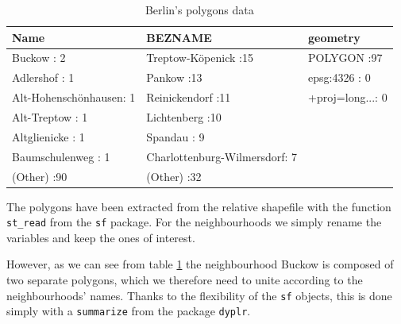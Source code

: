 \begin{table}[H]
\centering
\begin{tabular}{lll}
  \hline \hline
                  Name &                       BEZNAME &          geometry \\ 
  \hline
Buckow              : 2   & Treptow-Köpenick          :15   & POLYGON      :97   \\ 
  Adlershof           : 1   & Pankow                    :13   & epsg:4326    : 0   \\ 
  Alt-Hohenschönhausen: 1   & Reinickendorf             :11   & +proj=long...: 0   \\ 
  Alt-Treptow         : 1   & Lichtenberg               :10   &  \\ 
  Altglienicke        : 1   & Spandau                   : 9   &  \\ 
  Baumschulenweg      : 1   & Charlottenburg-Wilmersdorf: 7   &  \\ 
  (Other)             :90   & (Other)                   :32   &  \\ 
   \hline \hline
\end{tabular}
\caption{Berlin's polygons data}
\label{table:neighbourhoods}
\end{table}

The polygons have been extracted from the relative shapefile with the function \texttt{st\_read} from the \texttt{sf} package. For the neighbourhoods we simply rename the variables and keep the ones of interest.



However, as we can see from table \ref{table:neighbourhoods} the neighbourhood Buckow is composed of two separate polygons, which we therefore need to unite according to the neighbourhoods' names. Thanks to the flexibility of the \texttt{sf} objects, this is done simply with a \texttt{summarize} from the package \texttt{dyplr}.



